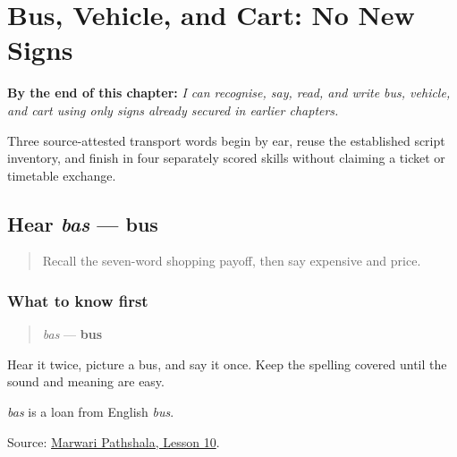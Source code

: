 
\chapter{Bus, Vehicle, and Cart: No New Signs}
\label{ch:mw-transport-three}

\begin{chapteropening}
\textbf{By the end of this chapter:} \emph{I can recognise, say, read, and write bus, vehicle, and cart using only signs already secured in earlier chapters.}

Three source-attested transport words begin by ear, reuse the established script inventory, and finish in four separately scored skills without claiming a ticket or timetable exchange.
\end{chapteropening}

\section[bas]{Hear \emph{bas} — bus}

\label{lesson:MW-C16-hear-bas}



\begin{quote}
Recall the seven-word shopping payoff, then say expensive and price.
\end{quote}

\subsection*{What to know first}
\begin{quote}
\emph{bas} — \textbf{bus}
\end{quote}

Hear it twice, picture a bus, and say it once. Keep the spelling covered until the sound and meaning are easy.

\begin{cousinweb}
\emph{bas} is a loan from English \emph{bus}.
\end{cousinweb}

\begin{tcolorbox}[breakable,colback=teal!4,colframe=teal!35!black,title={Before you move on}]
Source: \href{https://www.marwaripathshala.com/marwari-lesson-10-english}{Marwari Pathshala, Lesson 10}.
\end{tcolorbox}
